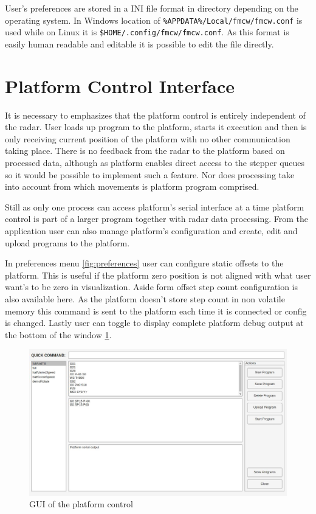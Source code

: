 User's preferences are stored in a INI file format in directory depending on the operating system.
In Windows location of \texttt{\%APPDATA\%/Local/fmcw/fmcw.conf} is used while on Linux it is \texttt{\$HOME/.config/fmcw/fmcw.conf}.
As this format is easily human readable and editable it is possible to edit the file directly.


\section{Platform Control Interface}

It is necessary to emphasizes that the platform control is entirely independent of the radar.
User loads up program to the platform, starts it execution and then is only receiving current position of the platform with no other communication taking place.
There is no feedback from the radar to the platform based on processed data, although as platform enables direct access to the stepper queues so it would be possible to implement such a feature.
Nor does processing take into account from which movements is platform program comprised.

Still as only one process can access platform's serial interface at a time platform control is part of a larger program together with radar data processing.
From the application user can also manage platform's configuration and create, edit and upload programs to the platform.

In preferences menu \ref{fig:preferences} user can configure static offsets to the platform.
This is useful if the platform zero position is not aligned with what user want's to be zero in visualization.
Aside form offset step count configuration is also available here.
As the platform doesn't store step count in non volatile memory this command is sent to the platform each time it is connected or config is changed.
Lastly user can toggle to display complete platform debug output at the bottom of the window \ref{fig:platformControl}.



\begin{figure}[h!]
  \centering
  \includegraphics[width=\textwidth]{../img/platform_control.jpg}
  \caption[GUI of the platform control]{GUI of the platform control}
  \label{fig:platformControl}
\end{figure}

